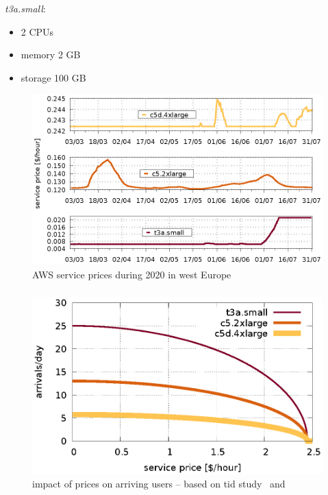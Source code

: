 \documentclass[aspectratio=169]{beamer}
\begin{document}
\begin{frame}
    \frametitle{\secname}
    \framesubtitle{\subsecname}
    \begin{minipage}{0.3\textwidth}
        \textit{t3a.small}:
        \begin{itemize}
            \item 2 CPUs
            \item memory 2 GB
            \item storage 100 GB
        \end{itemize}
    \end{minipage}
    \begin{minipage}{0.65\textwidth}
        \begin{figure}
            \centering
            \includegraphics[width=\textwidth]{img/experiment-aws-prices}
            \caption{AWS service prices during 2020 in west Europe }
            \label{fig:aws-prices}
        \end{figure}
    \end{minipage}
\end{frame}


\begin{frame}
    \frametitle{\secname}
    \framesubtitle{\subsecname}

    \begin{figure}
        \centering
        \includegraphics[width=.65\textwidth]{img/rho-arrivals}
        \caption{impact of prices on arriving users -- based on tid study~\cite{tid} and~\cite{xavierpricing}}
        \label{fig:arrivals}
    \end{figure}
\end{frame}
\end{document}
